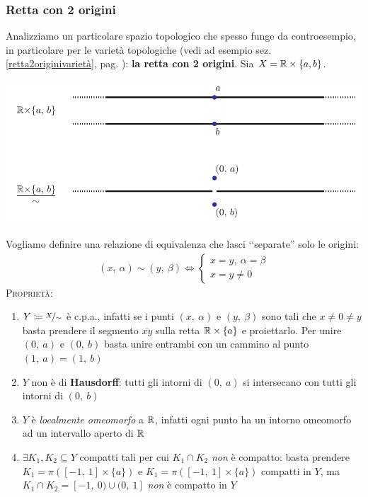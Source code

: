 \subsubsection{Retta con 2 origini} \label{retta 2 origini}
Analizziamo un particolare spazio topologico che spesso funge da controesempio, in particolare per le varietà topologiche (vedi ad esempio sez. \ref{retta2originivarietà}, pag. \pageref{retta2originivarietà}): \textbf{la retta con 2 origini}. \newline
Sia $X=\mathbb{R}\times\{a,b\}$.
\begin{center}
	\includegraphics[trim=0cm 0cm 0cm 0cm,clip,scale=0.95]{images/line2origins.pdf}
\end{center}
Vogliamo definire una relazione di equivalenza che lasci ‘‘separate'' solo le origini:
	\begin{gather*}
		(x, \ \alpha)\sim (y, \ \beta) \iff
			\begin{cases}
				x=y,\ \alpha=\beta \\
				x=y\neq 0
			\end{cases}		
	\end{gather*}
\textsc{Proprietà}:
\begin{enumerate}
	\item $Y\coloneqq \nicefrac{X}{\sim}$ è c.p.a., infatti se i punti $(x, \ \alpha)$ e $(y, \ \beta)$ sono tali che $x\neq 0 \neq y$ basta prendere il segmento $\overline{xy}$ sulla retta $\mathbb{R}\times\{a\}$ e proiettarlo. Per unire $(0,\ a)$ e $(0, \ b)$ basta unire entrambi con un cammino al punto $(1, \ a)=(1, \ b)$
	\item $Y$ non è di \textbf{Hausdorff}: tutti gli intorni di $(0, \ a)$ si intersecano con tutti gli intorni di $(0, \ b)$
	\item $Y$ è \textit{localmente omeomorfo} a $\mathbb{R}$, infatti ogni punto ha un intorno omeomorfo ad un intervallo aperto di $\mathbb{R}$
	\item $\exists K_1, K_2\subseteq Y$ compatti tali per cui $K_1\cap K_2$ \textit{non} è compatto: basta prendere $K_1=\pi\left([-1, \ 1]\times \{a\} \right)$ e $K_1=\pi\left([-1, \ 1]\times \{a\} \right)$ compatti in $Y$, ma $K_1\cap K_2= [-1,\ 0) \cup (0,\ 1]$ \textit{non} è compatto in $Y$
\end{enumerate}

